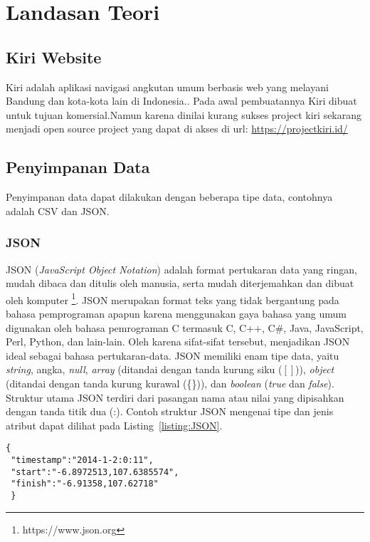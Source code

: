\chapter{Landasan Teori}
\label{chap:teori}

\section{Kiri Website }
\label{sec:Kiri} 
Kiri adalah aplikasi navigasi angkutan umum berbasis web yang melayani Bandung dan kota-kota lain di Indonesia.\cite{pascal:17:kiri}.
Pada awal pembuatannya Kiri dibuat untuk tujuan komersial.Namun karena dinilai kurang sukses project kiri sekarang menjadi open source project yang dapat di akses di url: \url{https://projectkiri.id/}

\section{Penyimpanan Data}
\label{sec:penyimpanan data}
Penyimpanan data dapat dilakukan dengan beberapa tipe data, contohnya adalah CSV dan JSON.

\subsection{JSON}
\label{subsec:json}
JSON (\textit{JavaScript Object Notation}) adalah format pertukaran data yang ringan, mudah dibaca dan ditulis oleh manusia, serta mudah diterjemahkan dan dibuat oleh komputer \footnote{https:\slash \slash www.json.org}. JSON merupakan format teks yang tidak bergantung pada bahasa pemprograman apapun karena menggunakan gaya bahasa yang umum digunakan oleh bahasa pemrograman C termasuk C, C++, C\#, Java, JavaScript, Perl, Python, dan lain-lain. Oleh karena sifat-sifat tersebut, menjadikan JSON ideal sebagai bahasa pertukaran-data. JSON memiliki enam tipe data, yaitu \textit{string}, angka, \textit{null}, \textit{array} (ditandai dengan tanda kurung siku ($\left [ \right ]$)), \textit{object} (ditandai dengan tanda kurung kurawal (\{\})), dan \textit{boolean} (\textit{true} dan \textit{false}). Struktur utama JSON terdiri dari pasangan nama atau nilai yang dipisahkan dengan tanda titik dua (:). Contoh struktur JSON mengenai tipe dan jenis atribut dapat dilihat pada Listing~\ref{listing:JSON}.

\begin{lstlisting}[caption=Contoh Struktur JSON, label=listing:JSON]
 {
 "timestamp":"2014-1-2:0:11",
 "start":"-6.8972513,107.6385574",
 "finish":"-6.91358,107.62718"
 }
\end{lstlisting}

